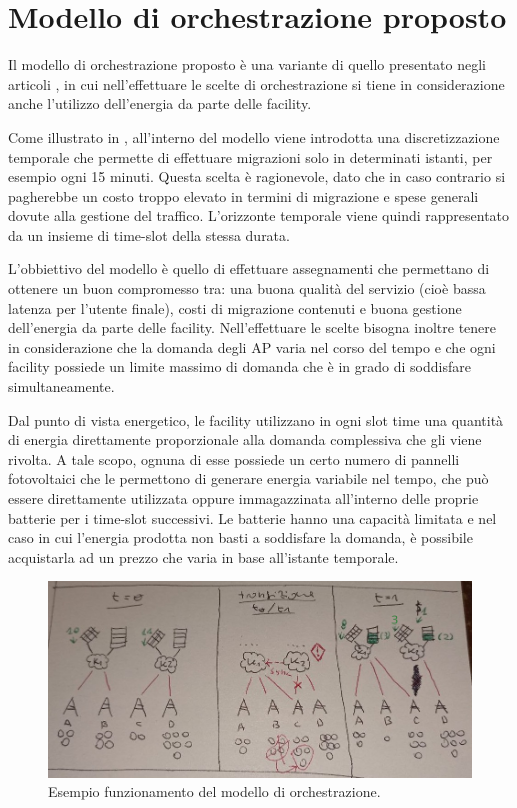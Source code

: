 %
%
\section{Modello di orchestrazione proposto}
\label{sec:modello-di-orchestrazione-proposto}

Il modello di orchestrazione proposto è una variante di quello presentato negli articoli \cite{assignment-patterns}, \cite{analytics-mec} in cui nell'effettuare le scelte di orchestrazione si tiene in considerazione anche l'utilizzo dell'energia da parte delle facility.

Come illustrato in \cite{analytics-mec}, all'interno del modello viene introdotta una discretizzazione temporale che permette di effettuare migrazioni solo in determinati istanti, per esempio ogni 15 minuti. Questa scelta è ragionevole, dato che in caso contrario si pagherebbe un costo troppo elevato in termini di migrazione e spese generali dovute alla gestione del traffico. L'orizzonte temporale viene quindi rappresentato da un insieme di time-slot della stessa durata.

L'obbiettivo del modello è quello di effettuare assegnamenti che permettano di ottenere un buon compromesso tra: una buona qualità del servizio (cioè bassa latenza per l'utente finale), costi di migrazione contenuti e buona gestione dell'energia da parte delle facility. Nell'effettuare le scelte bisogna inoltre tenere in considerazione che la domanda degli AP varia nel corso del tempo e che ogni facility possiede un limite massimo di domanda che è in grado di soddisfare simultaneamente.

Dal punto di vista energetico, le facility utilizzano in ogni slot time una quantità di energia direttamente proporzionale alla domanda complessiva che gli viene rivolta. A tale scopo, ognuna di esse possiede un certo numero di pannelli fotovoltaici che le permettono di generare energia variabile nel tempo, che può essere direttamente utilizzata oppure immagazzinata all'interno delle proprie batterie per i time-slot successivi. Le batterie hanno una capacità limitata e nel caso in cui l'energia prodotta non basti a soddisfare la domanda, è possibile acquistarla ad un prezzo che varia in base all'istante temporale.

\begin{figure}[t]
    \centering
    \includegraphics[width = 150mm]{img/example-assigments.jpg}
    \caption{Esempio funzionamento del modello di orchestrazione.}
    \label{fig:esempio-assegnamenti}
\end{figure}


